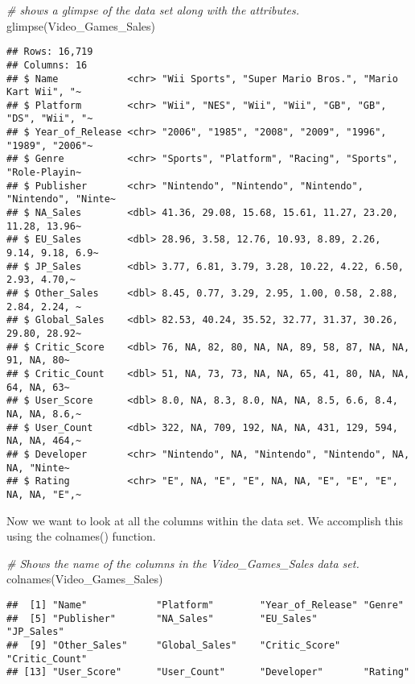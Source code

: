 \documentclass[
]{article}
\newenvironment{Shaded}{\begin{snugshade}}{\end{snugshade}}
\newcommand{\CommentTok}[1]{\textcolor[rgb]{0.56,0.35,0.01}{\textit{#1}}}
\newcommand{\FunctionTok}[1]{\textcolor[rgb]{0.00,0.00,0.00}{#1}}
\newcommand{\NormalTok}[1]{#1}
\begin{document}
\begin{Shaded}
\begin{Highlighting}[]
\CommentTok{\# shows a glimpse of the data set along with the attributes.}
\FunctionTok{glimpse}\NormalTok{(Video\_Games\_Sales)}
\end{Highlighting}
\end{Shaded}

\begin{verbatim}
## Rows: 16,719
## Columns: 16
## $ Name            <chr> "Wii Sports", "Super Mario Bros.", "Mario Kart Wii", "~
## $ Platform        <chr> "Wii", "NES", "Wii", "Wii", "GB", "GB", "DS", "Wii", "~
## $ Year_of_Release <chr> "2006", "1985", "2008", "2009", "1996", "1989", "2006"~
## $ Genre           <chr> "Sports", "Platform", "Racing", "Sports", "Role-Playin~
## $ Publisher       <chr> "Nintendo", "Nintendo", "Nintendo", "Nintendo", "Ninte~
## $ NA_Sales        <dbl> 41.36, 29.08, 15.68, 15.61, 11.27, 23.20, 11.28, 13.96~
## $ EU_Sales        <dbl> 28.96, 3.58, 12.76, 10.93, 8.89, 2.26, 9.14, 9.18, 6.9~
## $ JP_Sales        <dbl> 3.77, 6.81, 3.79, 3.28, 10.22, 4.22, 6.50, 2.93, 4.70,~
## $ Other_Sales     <dbl> 8.45, 0.77, 3.29, 2.95, 1.00, 0.58, 2.88, 2.84, 2.24, ~
## $ Global_Sales    <dbl> 82.53, 40.24, 35.52, 32.77, 31.37, 30.26, 29.80, 28.92~
## $ Critic_Score    <dbl> 76, NA, 82, 80, NA, NA, 89, 58, 87, NA, NA, 91, NA, 80~
## $ Critic_Count    <dbl> 51, NA, 73, 73, NA, NA, 65, 41, 80, NA, NA, 64, NA, 63~
## $ User_Score      <dbl> 8.0, NA, 8.3, 8.0, NA, NA, 8.5, 6.6, 8.4, NA, NA, 8.6,~
## $ User_Count      <dbl> 322, NA, 709, 192, NA, NA, 431, 129, 594, NA, NA, 464,~
## $ Developer       <chr> "Nintendo", NA, "Nintendo", "Nintendo", NA, NA, "Ninte~
## $ Rating          <chr> "E", NA, "E", "E", NA, NA, "E", "E", "E", NA, NA, "E",~
\end{verbatim}

Now we want to look at all the columns within the data set. We
accomplish this using the colnames() function.

\begin{Shaded}
\begin{Highlighting}[]
\CommentTok{\# Shows the name of the columns in the Video\_Games\_Sales data set.}
\FunctionTok{colnames}\NormalTok{(Video\_Games\_Sales)}
\end{Highlighting}
\end{Shaded}

\begin{verbatim}
##  [1] "Name"            "Platform"        "Year_of_Release" "Genre"          
##  [5] "Publisher"       "NA_Sales"        "EU_Sales"        "JP_Sales"       
##  [9] "Other_Sales"     "Global_Sales"    "Critic_Score"    "Critic_Count"   
## [13] "User_Score"      "User_Count"      "Developer"       "Rating"
\end{verbatim}
\end{document}
